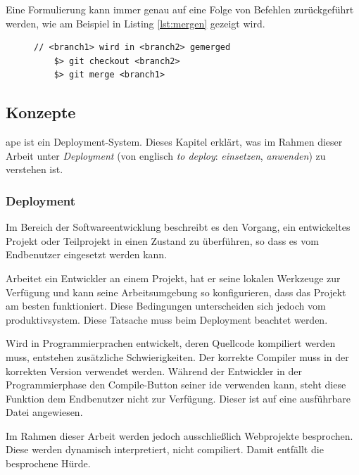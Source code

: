 Eine Formulierung kann immer genau auf eine Folge von Befehlen zurückgeführt werden, wie am Beispiel in Listing \ref{lst:mergen} gezeigt wird.

\begin{figure}
	\begin{lstlisting}[caption=Mergen von zwei Branches,label={lst:mergen}]
	// <branch1> wird in <branch2> gemerged
	$> git checkout <branch2>
	$> git merge <branch1>
	\end{lstlisting}
\end{figure}



\subsection{Konzepte} %
\label{sub:konzepte}

\gls{ape} ist ein Deployment-System. Dieses Kapitel erklärt, was im Rahmen dieser Arbeit unter \emph{Deployment} (von englisch \emph{to deploy}: \emph{einsetzen}, \emph{anwenden}) zu verstehen ist.

\subsubsection{Deployment} %
\label{ssub:deployment}

Im Bereich der Softwareentwicklung beschreibt es den Vorgang, ein entwickeltes Projekt oder Teilprojekt in einen Zustand zu überführen, so dass es vom Endbenutzer eingesetzt werden kann.

Arbeitet ein Entwickler an einem Projekt, hat er seine lokalen Werkzeuge zur Verfügung und kann seine Arbeitsumgebung so konfigurieren, dass das Projekt am besten funktioniert. Diese Bedingungen unterscheiden sich jedoch vom \gls{produktivsystem}. Diese Tatsache muss beim Deployment beachtet werden.

Wird in Programmierprachen entwickelt, deren Quellcode kompiliert werden muss, entstehen zusätzliche Schwierigkeiten. Der korrekte Compiler muss in der korrekten Version verwendet werden. Während der Entwickler in der Programmierphase den Compile-Button seiner \gls{ide} verwenden kann, steht diese Funktion dem Endbenutzer nicht zur Verfügung. Dieser ist auf eine ausführbare Datei angewiesen.

Im Rahmen dieser Arbeit werden jedoch ausschließlich Webprojekte besprochen. Diese werden dynamisch interpretiert, nicht compiliert. Damit entfällt die besprochene Hürde.

